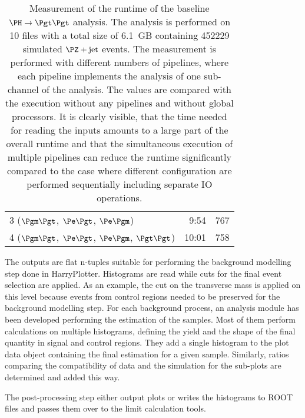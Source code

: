 \documentclass[3p]{elsarticle}
\begin{document}
\begin{table}[h!]
\begin{tabular}{lrr}
 3 ($\Pgm\Pgt$, $\Pe\Pgt$, $\Pe\Pgm$)             & 9:54                             & 767 \\
 4 ($\Pgm\Pgt$, $\Pe\Pgt$, $\Pe\Pgm$, $\Pgt\Pgt$) & 10:01                            & 758 \\
\end{tabular}
\caption[Measurement of the runtime of the baseline $\PH\to\Pgt\Pgt$ analysis.]{Measurement of the runtime of the baseline $\PH\to\Pgt\Pgt$ analysis.
The analysis is performed on 10 files with a total size of 6.1~GB containing 452229 simulated $\PZ+\text{jet}$ events.
The measurement is performed with different numbers of pipelines, where each pipeline implements the analysis of one sub-channel of the analysis.
The values are compared with the execution without any pipelines and without global processors.
It is clearly visible, that the time needed for reading the inputs amounts to a large part of the overall runtime and that the simultaneous execution of multiple pipelines can reduce the runtime significantly compared to the case where different configuration are performed sequentially including separate IO operations.}
\label{table_artus_runtime_comparison}
\end{table}

The outputs are flat n-tuples suitable for performing the background modelling step done in HarryPlotter.
Histograms are read while cuts for the final event selection are applied.
As an example, the cut on the transverse mass is applied on this level because events from control regions needed to be preserved for the background modelling step.
For each background process, an analysis module has been developed performing the estimation of the samples.
Most of them perform calculations on multiple histograms, defining the yield and the shape of the final quantity in signal and control regions.
They add a single histogram to the plot data object containing the final estimation for a given sample.
Similarly, ratios comparing the compatibility of data and the simulation for the sub-plots are determined and added this way.

The post-processing step either output plots or writes the histograms to ROOT files and passes them over to the limit calculation tools.


\vspace{2cm}

\end{document}
